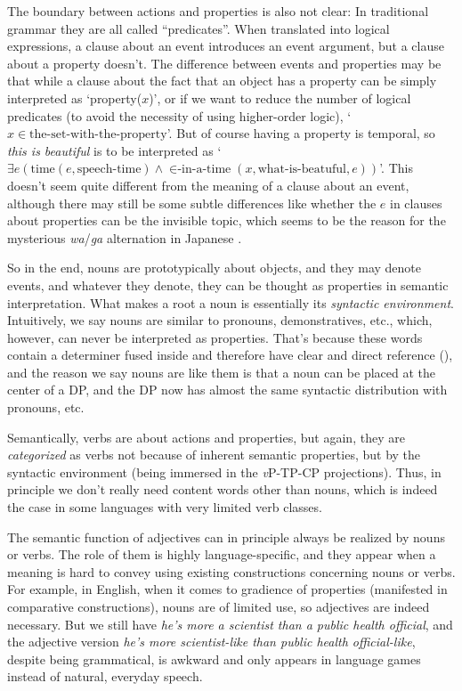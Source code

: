 \documentclass[UTF8, a4paper, oneside, scheme=plain, 12pt]{ctexbook}
\newcommand{\form}[1]{\emph{#1}}
\newcommand{\translate}[1]{`#1'}
\newcommand{\vP}{\textit{v}P}
\begin{document}
{The boundary between actions and properties is also not clear:
In traditional grammar they are all called ``predicates''.
When translated into logical expressions,
a clause about an event introduces an event argument,
but a clause about a property doesn't.
The difference between events and properties may be that
while a clause about the fact that an object has a property 
can be simply interpreted as \translate{property($x$)},
or if we want to reduce the number of logical predicates 
(to avoid the necessity of using higher-order logic),
\translate{$x \in \text{the-set-with-the-property}$}.
But of course having a property is temporal,
so \form{this is beautiful} is to be interpreted as 
\translate{$\exists e (\text{time}(e, \text{speech-time}) \land 
\text{$\in$-in-a-time}(x, \text{what-is-beatuful}, e) )$}.
This doesn't seem quite different from the meaning of a clause about an event,
although there may still be some subtle differences like 
whether the $e$ in clauses about properties can be the invisible topic, 
which seems to be the reason for the mysterious \form{wa}/\form{ga} alternation in Japanese
\citep{heycock2008}.

So in the end,
nouns are prototypically about objects,
and they may denote events, 
and whatever they denote, they can be thought as properties in semantic interpretation.
What makes a root a noun 
is essentially its \emph{syntactic environment}.
Intuitively, we say nouns are similar to pronouns, demonstratives, etc., 
which, however, can never be interpreted as properties.
That's because these words contain a determiner fused inside 
and therefore have clear and direct reference (),
and the reason we say nouns are like them 
is that a noun can be placed at the center of a DP, 
and the DP now has almost the same syntactic distribution with pronouns, etc. 

Semantically, verbs are about actions and properties,
but again, they are \emph{categorized} as verbs 
not because of inherent semantic properties, 
but by the syntactic environment
(being immersed in the \vP-TP-CP projections).
Thus, in principle we don't really need content words other than nouns,
which is indeed the case in some languages
with very limited verb classes.

The semantic function of adjectives can in principle always be realized by nouns or verbs.
The role of them is highly language-specific,
and they appear when a meaning is hard to convey using existing constructions concerning nouns or verbs.
For example, in English, when it comes to gradience of properties
(manifested in comparative constructions),
nouns are of limited use,
so adjectives are indeed necessary.
But we still have \form{he's more a scientist than a public health official},
and the adjective version \form{he's more scientist-like than public health official-like},
despite being grammatical, is awkward
and only appears in language games instead of natural, everyday speech.

}
\end{document}
